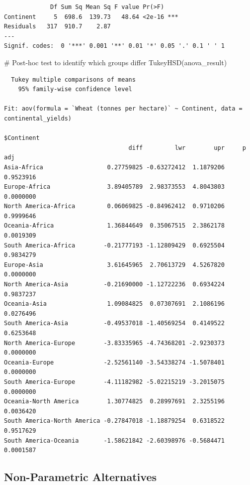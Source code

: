 \documentclass[
  letterpaper,
]{book}
\newenvironment{Shaded}{\begin{snugshade}}{\end{snugshade}}
\newcommand{\CommentTok}[1]{\textcolor[rgb]{0.37,0.37,0.37}{#1}}
\newcommand{\FunctionTok}[1]{\textcolor[rgb]{0.28,0.35,0.67}{#1}}
\newcommand{\NormalTok}[1]{\textcolor[rgb]{0.00,0.23,0.31}{#1}}
\begin{document}
\begin{verbatim}
             Df Sum Sq Mean Sq F value Pr(>F)    
Continent     5  698.6  139.73   48.64 <2e-16 ***
Residuals   317  910.7    2.87                   
---
Signif. codes:  0 '***' 0.001 '**' 0.01 '*' 0.05 '.' 0.1 ' ' 1
\end{verbatim}

\begin{Shaded}
\begin{Highlighting}[]
\CommentTok{\# Post{-}hoc test to identify which groups differ}
\FunctionTok{TukeyHSD}\NormalTok{(anova\_result)}
\end{Highlighting}
\end{Shaded}

\begin{verbatim}
  Tukey multiple comparisons of means
    95% family-wise confidence level

Fit: aov(formula = `Wheat (tonnes per hectare)` ~ Continent, data = continental_yields)

$Continent
                                   diff         lwr        upr     p adj
Asia-Africa                  0.27759825 -0.63272412  1.1879206 0.9523916
Europe-Africa                3.89405789  2.98373553  4.8043803 0.0000000
North America-Africa         0.06069825 -0.84962412  0.9710206 0.9999646
Oceania-Africa               1.36844649  0.35067515  2.3862178 0.0019309
South America-Africa        -0.21777193 -1.12809429  0.6925504 0.9834279
Europe-Asia                  3.61645965  2.70613729  4.5267820 0.0000000
North America-Asia          -0.21690000 -1.12722236  0.6934224 0.9837237
Oceania-Asia                 1.09084825  0.07307691  2.1086196 0.0276496
South America-Asia          -0.49537018 -1.40569254  0.4149522 0.6253648
North America-Europe        -3.83335965 -4.74368201 -2.9230373 0.0000000
Oceania-Europe              -2.52561140 -3.54338274 -1.5078401 0.0000000
South America-Europe        -4.11182982 -5.02215219 -3.2015075 0.0000000
Oceania-North America        1.30774825  0.28997691  2.3255196 0.0036420
South America-North America -0.27847018 -1.18879254  0.6318522 0.9517629
South America-Oceania       -1.58621842 -2.60398976 -0.5684471 0.0001587
\end{verbatim}

\subsection{Non-Parametric
Alternatives}\label{non-parametric-alternatives}
\end{document}
